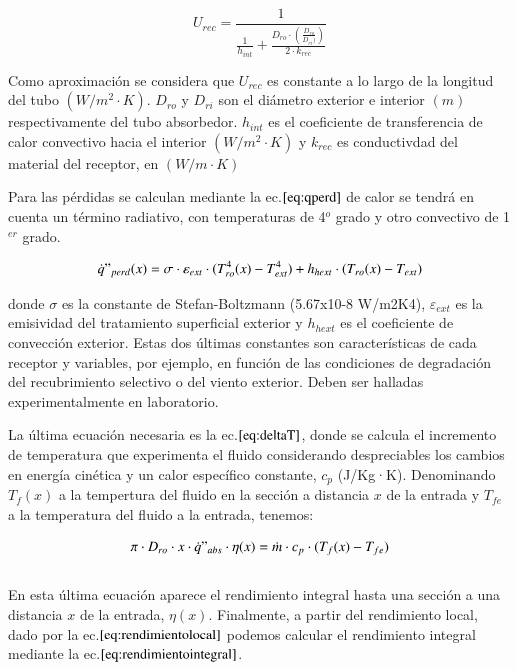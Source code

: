 \begin{equation}
    U_{rec} = \frac{1}{\frac{1}{h_{int}} + \frac{D_{ro}\cdot(\frac{D_{ro}}{D_{ri})})}{2\cdot k_{rec}}} \label{eq:urec}
\end{equation}

Como aproximación se considera que \(U_{rec}\) es constante a lo largo de la longitud del tubo \((W/m^{2}\cdot K)\). \(D_{ro}\) y \(D_{ri}\) son el diámetro exterior e interior \((m)\) respectivamente del tubo absorbedor. \(h_{int}\) es el coeficiente de transferencia de calor convectivo hacia el interior \((W/m^{2}\cdot K)\) y \(k_{rec}\) es conductivdad del material del receptor, en \((W/m\cdot K)\)

Para las pérdidas se calculan mediante la ec.\(\eqref{eq:qperd}\) de calor se tendrá en cuenta un término radiativo, con temperaturas de 4$^o$ grado y otro convectivo de 1$^{er}$ grado. 

\begin{equation}
    \dot{q}"_{perd}(x)= \sigma \cdot \varepsilon_{ext} \cdot (T_{ro}^{4}(x)-T_{ext}^{4}) + h_{hext} \cdot (T_{ro}(x)-T_{ext}) \label{eq:qperd}
\end{equation}

donde \(\sigma\) es la constante de Stefan-Boltzmann (5.67x10-8 W/m2K4), \(\varepsilon_{ext}\) es la emisividad del tratamiento superficial exterior y \(h_{hext}\) es el coeficiente de convección exterior. Estas dos últimas constantes son características de cada receptor y variables, por ejemplo, en función de las condiciones de degradación del recubrimiento selectivo o del viento exterior. Deben ser halladas experimentalmente en laboratorio.

La última ecuación necesaria es la ec.\(\eqref{eq:deltaT}\), donde se calcula el incremento de temperatura que experimenta el fluido considerando despreciables los cambios en energía cinética y un calor específico constante, \(c_{p}\) (J/Kg·K). Denominando \(T_{f}(x)\) a la tempertura del fluido en la sección a distancia \(x\) de la entrada y \(T_{fe}\) a la temperatura del fluido a la entrada, tenemos:

\begin{equation}
    \pi \cdot D_{ro} \cdot x \cdot \dot{q}"_{abs} \cdot \eta(x)= \dot{m} \cdot c_{p} \cdot (T_{f}(x)-T_{fe}) \label{eq:deltaT}
\end{equation}\\

En esta última ecuación aparece el rendimiento integral hasta una sección a una distancia \(x\) de la entrada, \(\eta(x)\). Finalmente, a partir del rendimiento local, dado por la ec.\(\eqref{eq:rendimientolocal}\) podemos calcular el rendimiento integral mediante la ec.\(\eqref{eq:rendimientointegral}\).

